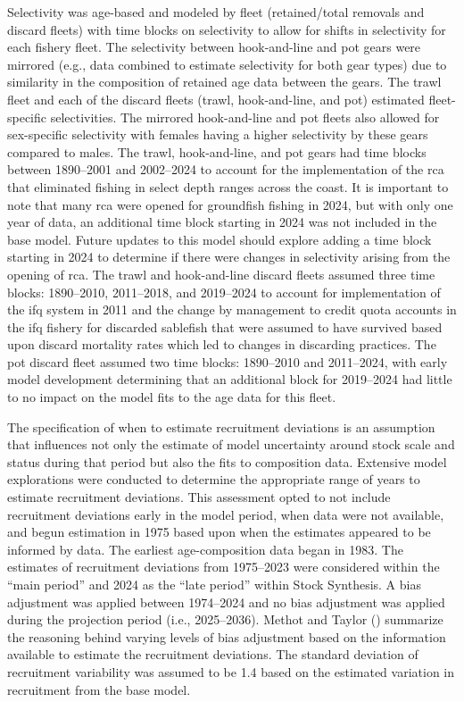 \documentclass[
  english,
]{article}
\begin{document}
Selectivity was age-based and modeled by fleet (retained/total removals
and discard fleets) with time blocks on selectivity to allow for shifts
in selectivity for each fishery fleet. The selectivity between
hook-and-line and pot gears were mirrored (e.g., data combined to
estimate selectivity for both gear types) due to similarity in the
composition of retained age data between the gears. The trawl fleet and
each of the discard fleets (trawl, hook-and-line, and pot) estimated
fleet-specific selectivities. The mirrored hook-and-line and pot fleets
also allowed for sex-specific selectivity with females having a higher
selectivity by these gears compared to males. The trawl, hook-and-line,
and pot gears had time blocks between 1890--2001 and 2002--2024 to
account for the implementation of the \gls{rca} that eliminated fishing
in select depth ranges across the coast. It is important to note that
many \gls{rca} were opened for groundfish fishing in 2024, but with only
one year of data, an additional time block starting in 2024 was not
included in the base model. Future updates to this model should explore
adding a time block starting in 2024 to determine if there were changes
in selectivity arising from the opening of \gls{rca}. The trawl and
hook-and-line discard fleets assumed three time blocks: 1890--2010,
2011--2018, and 2019--2024 to account for implementation of the
\gls{ifq} system in 2011 and the change by management to credit quota
accounts in the \gls{ifq} fishery for discarded sablefish that were
assumed to have survived based upon discard mortality rates which led to
changes in discarding practices. The pot discard fleet assumed two time
blocks: 1890--2010 and 2011--2024, with early model development
determining that an additional block for 2019--2024 had little to no
impact on the model fits to the age data for this fleet.

The specification of when to estimate recruitment deviations is an
assumption that influences not only the estimate of model uncertainty
around stock scale and status during that period but also the fits to
composition data. Extensive model explorations were conducted to
determine the appropriate range of years to estimate recruitment
deviations. This assessment opted to not include recruitment deviations
early in the model period, when data were not available, and begun
estimation in 1975 based upon when the estimates appeared to be informed
by data. The earliest age-composition data began in 1983. The estimates
of recruitment deviations from 1975--2023 were considered within the
``main period'' and 2024 as the ``late period'' within Stock Synthesis.
A bias adjustment was applied between 1974--2024 and no bias adjustment
was applied during the projection period (i.e., 2025--2036). Methot and
Taylor () summarize the
reasoning behind varying levels of bias adjustment based on the
information available to estimate the recruitment deviations. The
standard deviation of recruitment variability was assumed to be 1.4
based on the estimated variation in recruitment from the base model.
\end{document}
